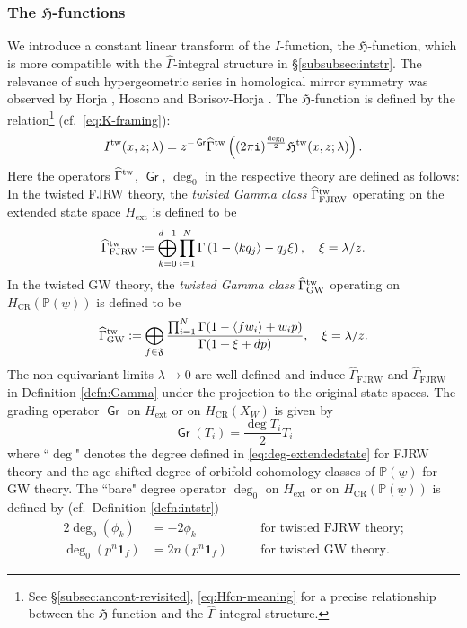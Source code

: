 \documentclass[11pt]{amsart}
\theoremstyle{definition} %
\theoremstyle{remark} %
\newcommand{\PP}{\mathbb P}
\newcommand{\tw}{{\rm tw}}
\def\GW{\operatorname{\text{GW}}}
\def\CR{\operatorname{\text{CR}}}
\def\fracp#1{\left\langle #1 \right\rangle}
\newcommand{\frF}{\mathfrak{F}}
\newcommand{\unit}{\boldsymbol{1}}
\newcommand{\ext}{{\operatorname{ext}}}
\newcommand{\FJRW}{{\operatorname{FJRW}}}
\renewcommand{\GW}{{\operatorname{GW}}}
\renewcommand{\CR}{{\operatorname{CR}}}
\newcommand{\grading}{\operatorname{\mathsf{Gr}}} %
\newcommand{\hGamma}{\widehat{\Gamma}}
\newcommand{\iu}{\mathtt{i}}
\newcommand{\Hf}{{\mathfrak{H}}}
\newcommand{\uw}{\underline{w}}
\begin{document}
\subsubsection{The $\Hf$-functions} 
\label{subsubsec:Hfunct}
We introduce a constant linear transform of the $I$-function, 
the $\Hf$-function, 
which is more compatible with the $\hGamma$-integral structure
in \S \ref{subsubsec:intstr}. 
The relevance of such hypergeometric series in 
homological mirror symmetry was observed 
by Horja \cite{Ho}, Hosono \cite{Hosono:centralcharge} 
and Borisov-Horja \cite{Borisov-Horja:FM}. 
The $\Hf$-function 
is defined by the relation\footnote
{See \S \ref{subsec:ancont-revisited}, \eqref{eq:Hfcn-meaning} 
for a precise relationship between the $\Hf$-function and 
the $\hGamma$-integral structure.}  
(cf.\ \eqref{eq:K-framing}): 
\begin{equation}
\label{eq:Ifunct-Hfunct}
I^\tw(x,z;\lambda) = z^{-\grading} \hGamma^\tw 
\left( 
(2\pi\iu)^{\frac{\deg_0}{2}}
\Hf^\tw(x,z;\lambda)\right).      
\end{equation} 
Here the operators $\hGamma^\tw$, $\grading$, $\deg_0$ 
in the respective theory are defined as follows:  
In the twisted FJRW theory, the \emph{twisted Gamma class} 
$\hGamma_{\FJRW}^\tw$ operating on 
the extended state space $H_{\ext}$ is defined to be 
\[
\hGamma^\tw_{\FJRW} := \bigoplus_{k=0}^{d-1} 
\prod_{i=1}^N \Gamma\left(1-\fracp{kq_j}-q_j\xi \right), 
\quad \xi = \lambda/z. 
\]
In the twisted GW theory, 
the \emph{twisted Gamma class}  
$\hGamma_{\GW}^\tw$ operating on $H_{\CR}(\PP(\uw))$ 
is defined to be 
\[
\hGamma_{\GW}^\tw:= \bigoplus_{f\in \frF} 
\frac{
\prod_{i=1}^N
\Gamma(1 - \fracp{fw_i}+ w_i p)}
{\Gamma(1+\xi+d p)}, \quad 
\xi = \lambda/z. 
\]
The non-equivariant limits $\lambda \to 0$ are well-defined and 
induce $\hGamma_{\FJRW}$ and $\hGamma_{\FJRW}$ 
in Definition \ref{defn:Gamma}  
under the projection to the original state spaces. 
The grading operator $\grading$ on $H_{\ext}$ or on 
$H_{\CR}(X_W)$ is given by 
\[
\grading (T_i ) = \frac{\deg T_i}{2} T_i 
\]
where ``$\deg$" denotes the degree defined in 
\eqref{eq:deg-extendedstate} for FJRW theory 
and the age-shifted degree of orbifold 
cohomology classes of $\PP(\uw)$ for GW theory. 
The ``bare" degree operator $\deg_0$ on $H_{\ext}$ 
or on $H_{\CR}(\PP(\uw))$ is defined by 
(cf.\ Definition \ref{defn:intstr}) 
\begin{alignat*}{2} 
\deg_0(\phi_k) &= -2 \phi_k  
& & \text{for twisted FJRW theory;} \\
\deg_0(p^n \unit_f) & = 2n (p^n \unit_f) \quad 
& & \text{for twisted GW theory.}
\end{alignat*}
 
\end{document}
